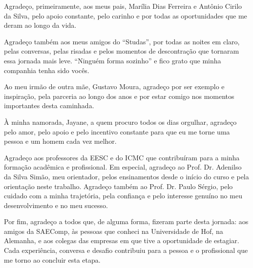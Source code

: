 Agradeço, primeiramente, aos meus pais, Marília Dias Ferreira e Antônio Cirilo da Silva, pelo apoio constante, pelo carinho e por todas as oportunidades que me deram ao longo da vida.

Agradeço também aos meus amigos do ``Studas'', por todas as noites em claro, pelas conversas, pelas risadas e pelos momentos de descontração que tornaram essa jornada mais leve. ``Ninguém forma sozinho'' e fico grato que minha companhia tenha sido vocês.

Ao meu irmão de outra mãe, Gustavo Moura, agradeço por ser exemplo e inspiração, pela parceria ao longo dos anos e por estar comigo nos momentos importantes desta caminhada.

À minha namorada, Jayane, a quem procuro todos os dias orgulhar, agradeço pelo amor, pelo apoio e pelo incentivo constante para que eu me torne uma pessoa e um homem cada vez melhor.

Agradeço aos professores da EESC e do ICMC que contribuíram para a minha formação acadêmica e profissional. Em especial, agradeço ao Prof. Dr. Adenilso da Silva Simão, meu orientador, pelos ensinamentos desde o início do curso e pela orientação neste trabalho. Agradeço também ao Prof. Dr. Paulo Sérgio, pelo cuidado com a minha trajetória, pela confiança e pelo interesse genuíno no meu desenvolvimento e no meu sucesso.

Por fim, agradeço a todos que, de alguma forma, fizeram parte desta jornada: aos amigos da SAEComp, às pessoas que conheci na Universidade de Hof, na Alemanha, e aos colegas das empresas em que tive a oportunidade de estagiar. Cada experiência, conversa e desafio contribuiu para a pessoa e o profissional que me torno ao concluir esta etapa.
